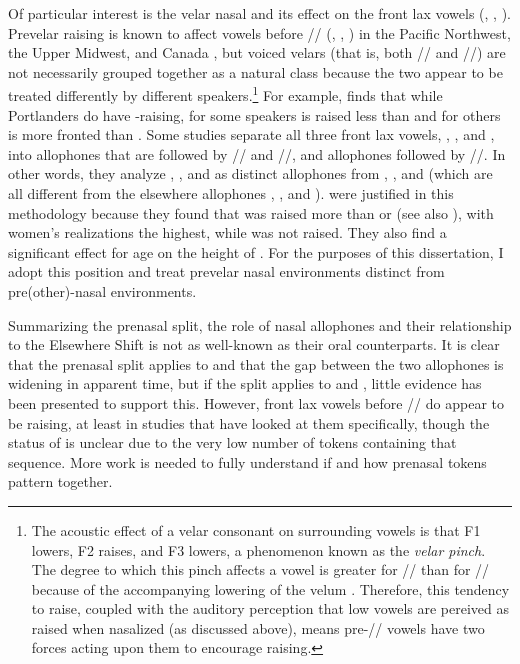 Of particular interest is the velar nasal and its effect on the front lax vowels (\bang, \beng, \bing). Prevelar raising is known to affect vowels before // (\bag, \beg, \vague) in the Pacific Northwest, the Upper Midwest, and Canada \citep{stanley_2019_ADS}, but voiced velars (that is, both // and //) are not necessarily grouped together as a natural class because the two appear to be treated differently by different speakers.\footnote{The acoustic effect of a velar consonant on surrounding vowels is that F1 lowers, F2 raises, and F3 lowers, a phenomenon known as the \textit{velar pinch}. The degree to which this pinch affects a vowel is greater for // than for // because of the accompanying lowering of the velum \citep{baker_etal_2008}. Therefore, this tendency to raise, coupled with the auditory perception that low vowels are pereived as raised when nasalized (as discussed above), means pre-// vowels have two forces acting upon them to encourage raising.} For example, \citet[46]{conn_2000_diss} finds that while Portlanders do have \ban-raising, for some speakers \bang is raised less than \ban and for others \bang is more fronted than \ban. Some studies separate all three front lax vowels, \kit, \dress, and \trap, into allophones that are followed by // and //, and allophones followed by //. In other words, they analyze \bin, \ben, and \ban as distinct allophones from \bing, \beng, and \bang (which are all different from the elsewhere allophones \bit, \bet, and \bat). \citet[42]{cardoso_etal_2016_pads} were justified in this methodology because they found that \bing was raised more than \bin or \bit (see also \citealt{eckert_2004}), with women's realizations the highest, while \bin was not raised. They also find a significant effect for age on the height of \bang. For the purposes of this dissertation, I adopt this position and treat prevelar nasal environments distinct from pre(other)-nasal environments.

Summarizing the prenasal split, the role of nasal allophones and their relationship to the Elsewhere Shift is not as well-known as their oral counterparts. It is clear that the prenasal split applies to \trap and that the gap between the two allophones is widening in apparent time, but if the split applies to \dress and \kit, little evidence has been presented to support this. However, front lax vowels before // do appear to be raising, at least in studies that have looked at them specifically, though the status of \beng is unclear due to the very low number of tokens containing that sequence. More work is needed to fully understand if and how prenasal tokens pattern together.


